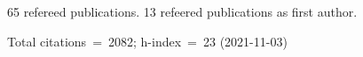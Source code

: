 65 refereed publications. 13 refeered publications as first author.

Total citations~=~2082; h-index~=~23 (2021-11-03)